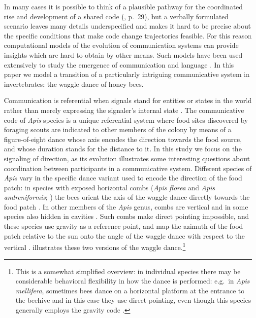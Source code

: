 \documentclass[11pt]{article}
\begin{document}
In many cases it is possible to think of a plausible pathway for the
coordinated rise and development of a shared code
(\citealp{skyrms2010signals}, p.~29), but a verbally
formulated scenario leaves many details underspecified and makes it
hard to be precise about the specific conditions that make code change
trajectories feasible. For this reason computational models of the
evolution of communication systems can provide insights which are hard to
obtain by other means. Such models have been used extensively to study
the emergence of communication and language
\citep[][see  for
details]{nowak1999evolution,smith2003iterated,wagner2003progress,skyrms2010signals,lazaridou2020emergent}. In
this paper we model a transition of a particularly intriguing
communicative system in invertebrates: the waggle dance of honey bees.

Communication is referential when signals stand for entities or states in the
world rather than merely expressing the signaler's internal state
\citep{macedonia1993variation,wheeler2012functionally}. The
communicative code of \emph{Apis} species \citep{vonFrisch1967DanceLanguage} is a unique
referential system where food sites discovered by foraging scouts are indicated
to other members of the colony by means of a figure-of-eight dance whose axis
encodes the direction towards the food source, and whose duration stands for the distance
to it. In this study we focus on the signaling of direction, as its evolution illustrates
some interesting questions about coordination between participants in a communicative
system.
Different species of \emph{Apis} vary in the specific dance variant used to
encode the direction of the food patch: in species with exposed horizontal combs
(\emph{Apis florea} and \emph{Apis andreniformis};
\citealp{hepburn2011biogeography}) the bees orient the axis of the
waggle dance directly towards the food patch
\citep[for \emph{A. florea} see][]{dyer1985mechanisms,dyer2002biology}.
In other members of the \emph{Apis}
genus, combs are vertical and in some species also hidden in cavities
\citep{hepburn2014nests}. Such
combs make direct pointing impossible, and these species use gravity as a
reference point, and map the azimuth of the food patch relative to the sun onto
the angle of the waggle dance with respect to the vertical
\citep{vonFrisch1967DanceLanguage,dyer2002biology}. 
illustrates these two versions of the waggle dance.\footnote{This is a somewhat
simplified overview: in individual species there may be considerable behavioral
flexibility in how the dance is performed: e.g.\ in \textit{Apis mellifera}, sometimes
bees dance on a horizontal platform at the entrance to the beehive and in this case
they use direct pointing, even though this species generally employs the gravity
code \citep{Esch2012}.} 
\end{document}
